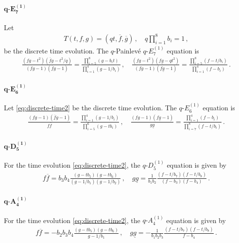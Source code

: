 \documentclass[11pt, a4paper]{article}
\theoremstyle{definition}
\begin{document}
\paragraph{$ \boldsymbol{q\text{-}E_7^{(1)}} $}
Let
\begin{align}\label{eq:discrete-time2}
    T(t, f, g) = (qt, \overline{f}, \overline{g}) \, , \quad
    q \prod_{i=1}^8 b_i = 1 \, ,
\end{align}
be the discrete time evolution. The $ q $-Painlev\'e $ q\text{-}E_7^{(1)} $ equation is
\begin{align}\label{eq:qE7}
    \frac{(fg-t^2) (\overline{f}g-t^2/q)}{(fg-1)(\overline{f}g-1)} = \frac{\prod_{i=5}^8 (g-b_it)}{\prod_{i=1}^4 (g-1/b_i)} \, , \quad
    \frac{(fg-t^2) (f\underline{g}-qt^2)}{(fg-1)(f\underline{g}-1)} = \frac{\prod_{i=5}^8 (f-t/b_i)}{\prod_{i=1}^4 (f-b_i)} \, .
\end{align}


\paragraph{$ \boldsymbol{q\text{-}E_6^{(1)}} $}
Let \eqref{eq:discrete-time2} be the discrete time evolution. The $ q\text{-}E_6^{(1)} $ equation is
\begin{align}\label{eq:qE6}
    \frac{(fg-1)(\overline{f}g-1)}{f\overline{f}} = \frac{\prod_{i=1}^4 (g-1/b_i)}{\prod_{i=5}^6 (g-t b_i)} \, , \quad
    \frac{(fg-1)(f\underline{g}-1)}{g\underline{g}} = \frac{\prod_{i=1}^4 (f-b_i)}{\prod_{i=7}^8 (f-t/b_i)} \, .
\end{align}

\paragraph{$ \boldsymbol{q\text{-}D_5^{(1)}} $}
For the time evolution \eqref{eq:discrete-time2}, the $ q\text{-}D_5^{(1)} $ equation is given by
\begin{align}\label{eq:qD5}
    f\overline{f} = b_3b_4 \frac{(g-tb_5)(g-tb_6)}{(g-1/b_1)(g-1/b_2)} \, , \quad
    g\underline{g} = \frac{1}{b_1b_2} \frac{(f-t/b_7)(f-t/b_8)}{(f-b_3)(f-b_4)} \, .
\end{align}

\paragraph{$ \boldsymbol{q\text{-}A_4^{(1)}} $}
For the time evolution \eqref{eq:discrete-time2}, the $ q\text{-}A_4^{(1)} $ equation is given by
\begin{align}\label{eq:qA4}
    f\overline{f} = -b_2b_3b_4 \frac{(g-t b_5)(g-t b_6)}{g-1/b_1} \, , \quad
    g\underline{g} = -\frac{1}{b_1b_2b_3} \frac{(f-t/b_7)(f-t/b_8)}{f-b_4} \, .
\end{align}
\end{document}
